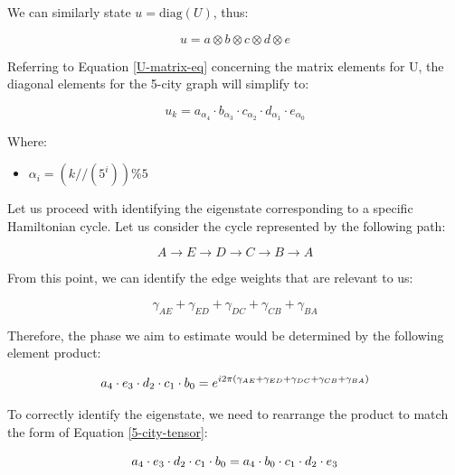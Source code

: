 \documentclass[msc,oneside]{ubcthesis}
\begin{document}
	
	We can similarly state $ u = \mathrm{diag}(U)$, thus:
	
	$$ u = a \otimes b \otimes c \otimes d \otimes e$$
	
	
	Referring to Equation \eqref{U-matrix-eq} concerning the matrix elements for U,  the diagonal elements for the 5-city graph will simplify to:
	
	\begin{equation}\label{5-city-tensor}
		u_{k} = a_{\alpha_{4}}\cdot b _{\alpha_{3}} \cdot c_{\alpha_2} \cdot d_{\alpha_{1}}\cdot e_{\alpha_{0}}
	\end{equation}
	
	Where:
	\begin{itemize}
		\item[] $\alpha_i = \left(k//\left(5^{i}\right)\right) \% 5$
	\end{itemize}
	
	
	\vspace{0.5cm}
	
	Let us proceed with identifying the eigenstate corresponding to a specific Hamiltonian cycle. Let us consider the cycle represented by the following path:
	
	\begin{equation}\label{one-ham-cycle-5-city}
		A \rightarrow E \rightarrow D \rightarrow C \rightarrow B \rightarrow A
	\end{equation}
	
	From this point, we can identify the edge weights that are relevant to us:
	
	\begin{equation*}
		\gamma_{AE} + \gamma_{ED} + \gamma_{DC} + \gamma_{CB} + \gamma_{BA}
	\end{equation*}
	
	Therefore, the phase we aim to estimate would be determined by the following element product:
	
	\begin{equation*}
		\Large{a_{4} \cdot e_{3} \cdot d_{2} \cdot c_{1} \cdot b_{0} = e^{i2\pi (\gamma_{AE} + \gamma_{ED} + \gamma_{DC} + \gamma_{CB} + \gamma_{BA})}}
	\end{equation*}
	
	
	To correctly identify the eigenstate, we need to rearrange the product to match the form of Equation \eqref{5-city-tensor}:
	
	\begin{equation*}
		\Large{a_{4} \cdot e_{3} \cdot d_{2} \cdot c_{1} \cdot b_{0}= a_{4} \cdot b_{0}  \cdot c_{1}\cdot d_{2} \cdot e_{3}}
	\end{equation*}
	
\end{document}
